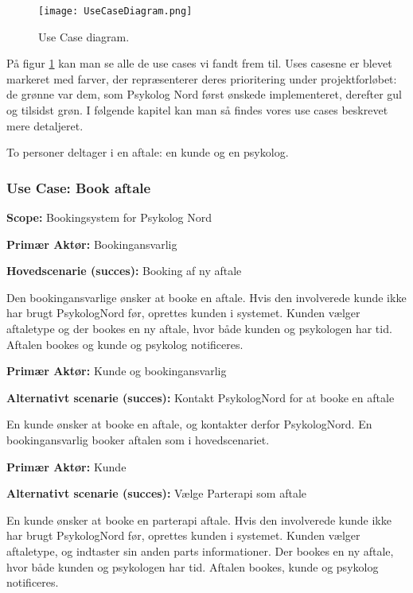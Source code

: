 \begin{figure}[p]
	\centering
  		\texttt{[image: UseCaseDiagram.png]}
  \caption{Use Case diagram.}
  \label{fig:UseCaseDiagram}
\end{figure}

På figur \ref{fig:UseCaseDiagram} kan man se alle de use cases vi fandt frem til.
Uses casesne er blevet markeret med farver, der repræsenterer deres prioritering under projektforløbet: de grønne var dem, som Psykolog Nord først ønskede implementeret, derefter gul og tilsidst grøn.
I følgende kapitel kan man så findes vores use cases beskrevet mere detaljeret. 

To personer deltager i en aftale: en kunde og en psykolog.

\subsubsection{Use Case: Book aftale}\label{usecase:bookaftale}
{\setlength{\parindent}{0cm}
\textbf{Scope:} Bookingsystem for Psykolog Nord

\textbf{Primær Aktør:} Bookingansvarlig

\textbf{Hovedscenarie (succes):} Booking af ny aftale

Den bookingansvarlige ønsker at booke en aftale.
Hvis den involverede kunde ikke har brugt PsykologNord før, oprettes kunden i systemet.
Kunden vælger aftaletype og der bookes en ny aftale, hvor både kunden og psykologen har tid. 
Aftalen bookes og kunde og psykolog notificeres.

\textbf{Primær Aktør:} Kunde og bookingansvarlig

\textbf{Alternativt scenarie (succes):} Kontakt PsykologNord for at booke en aftale

En kunde ønsker at booke en aftale, og kontakter derfor PsykologNord.
En bookingansvarlig booker aftalen som i hovedscenariet.

\textbf{Primær Aktør:} Kunde

\textbf{Alternativt scenarie (succes):} Vælge Parterapi som aftale

En kunde ønsker at booke en parterapi aftale.
Hvis den involverede kunde ikke har brugt PsykologNord før, oprettes kunden i systemet.
Kunden vælger aftaletype, og indtaster sin anden parts informationer.
Der bookes en ny aftale, hvor både kunden og psykologen har tid. 
Aftalen bookes, kunde og psykolog notificeres.
}

